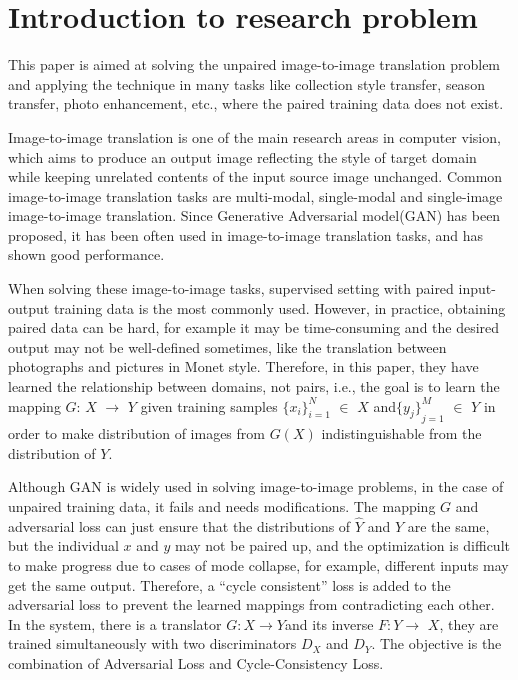 \section{Introduction to research problem}

This paper is aimed at solving the unpaired image-to-image translation problem and applying the technique in many tasks like collection style transfer, season transfer, photo enhancement, etc., where the paired training data does not exist.

Image-to-image translation is one of the main research areas in computer vision, which aims to produce an output image reflecting the style of target domain while keeping unrelated contents of the input source image unchanged. Common image-to-image translation tasks are multi-modal, single-modal and single-image image-to-image translation. Since Generative Adversarial model(GAN) has been proposed, it has been often used in image-to-image translation tasks, and has shown good performance.

When solving these image-to-image tasks, supervised setting with paired input-output training data is the most commonly used. However, in practice, obtaining paired data can be hard, for example it may be time-consuming and the desired output may not be well-defined sometimes, like the translation between photographs and pictures in Monet style. Therefore, in this paper, they have learned the relationship between domains, not pairs, i.e., the goal is to learn the mapping $G$: $X$ $\longrightarrow$ $Y$ given training samples $ {\{x_i\}}_{i=1}^N$ $\in$ $X$ and${\{y_j\}}_{j=1}^M$ $\in$ $Y$ in order to make distribution of images from $G(X)$ indistinguishable from the distribution of $Y$.

Although GAN is widely used in solving image-to-image problems, in the case of unpaired training data, it fails and needs modifications. The mapping $G$ and adversarial loss can just ensure that the distributions of $\hat{Y}$ and $Y$ are the same, but the individual $x$ and $y$ may not be paired up, and the optimization is difficult to make progress due to cases of mode collapse, for example, different inputs may get the same output. Therefore, a “cycle consistent” loss is added to the adversarial loss to prevent the learned mappings from contradicting each other. In the system, there is a translator $G: X $$\longrightarrow$$ Y $and its inverse $ F: Y $$\longrightarrow$ $X$, they are trained simultaneously with two discriminators $D_{X}$ and $D_{Y}$. The objective is the combination of Adversarial Loss and Cycle-Consistency Loss.

